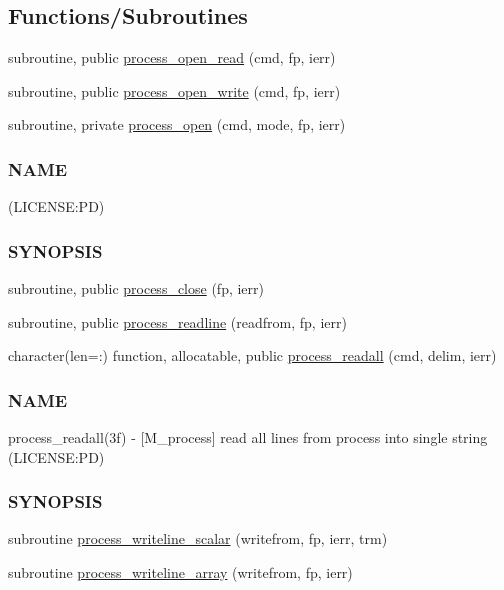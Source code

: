 \subsection*{Functions/\+Subroutines}
\begin{DoxyCompactItemize}
\item 
subroutine, public \mbox{\hyperlink{namespacem__process_aaaf4d1926258a4cec7da7fc61c38c79d}{process\+\_\+open\+\_\+read}} (cmd, fp, ierr)
\item 
subroutine, public \mbox{\hyperlink{namespacem__process_aa6ed1404ab3472f5068ed15a7a01defc}{process\+\_\+open\+\_\+write}} (cmd, fp, ierr)
\item 
subroutine, private \mbox{\hyperlink{namespacem__process_a3c0f543a9ceff2671041d73660f60a59}{process\+\_\+open}} (cmd, mode, fp, ierr)
\begin{DoxyCompactList}\small\item\em \subsubsection*{N\+A\+ME}

(L\+I\+C\+E\+N\+SE\+:PD) \subsubsection*{S\+Y\+N\+O\+P\+S\+IS}\end{DoxyCompactList}\item 
subroutine, public \mbox{\hyperlink{namespacem__process_ab4c5cad3fb46686f0c9b71c3a634f6ae}{process\+\_\+close}} (fp, ierr)
\item 
subroutine, public \mbox{\hyperlink{namespacem__process_acbc72c5ed371430a471aa1f3010fbbda}{process\+\_\+readline}} (readfrom, fp, ierr)
\item 
character(len=\+:) function, allocatable, public \mbox{\hyperlink{namespacem__process_a7dd759a1344789477ae1e205d7fa9a51}{process\+\_\+readall}} (cmd, delim, ierr)
\begin{DoxyCompactList}\small\item\em \subsubsection*{N\+A\+ME}

process\+\_\+readall(3f) -\/ \mbox{[}M\+\_\+process\mbox{]} read all lines from process into single string (L\+I\+C\+E\+N\+SE\+:PD) \subsubsection*{S\+Y\+N\+O\+P\+S\+IS}\end{DoxyCompactList}\item 
subroutine \mbox{\hyperlink{namespacem__process_a72527c0ec0af26dcb14b8bfad6dcd482}{process\+\_\+writeline\+\_\+scalar}} (writefrom, fp, ierr, trm)
\item 
subroutine \mbox{\hyperlink{namespacem__process_a08887a918eba167ceacddf58ca084270}{process\+\_\+writeline\+\_\+array}} (writefrom, fp, ierr)
\end{DoxyCompactItemize}

